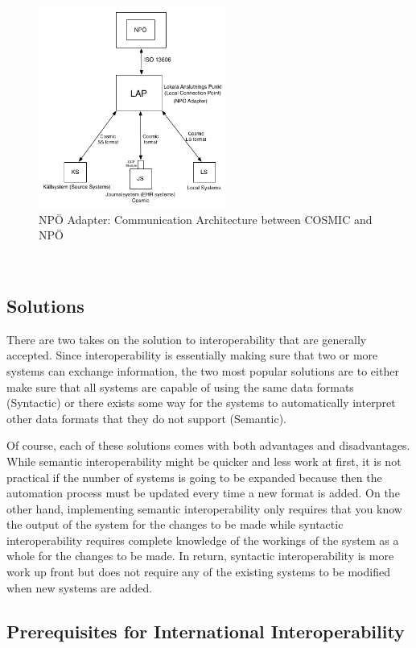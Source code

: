 \documentclass[14pt]{article}
\begin{document}
\begin{figure}[h!]
  \caption{NPÖ Adapter: Communication Architecture between COSMIC and NPÖ}
  \centering
    \includegraphics[width=0.55\textwidth]{Images/npoAdapt}
\end{figure}\

\subsection{Solutions}
\label{sec:interopSolutions}
There are two takes on the solution to interoperability that are generally accepted.  Since interoperability is essentially making sure that two or more systems can exchange information, the two most popular solutions are to either make sure that all systems are capable of using the same data formats (Syntactic) or there exists some way for the systems to automatically interpret other data formats that they do not support (Semantic).

Of course, each of these solutions comes with both advantages and disadvantages.  While semantic interoperability might be quicker and less work at first, it is not practical if the number of systems is going to be expanded because then the automation process must be updated every time a new format is added.  On the other hand, implementing semantic interoperability only requires that you know the output of the system for the changes to be made while syntactic interoperability requires complete knowledge of the workings of the system as a whole for the changes to be made.  In return, syntactic interoperability is more work up front but does not require any of the existing systems to be modified when new systems are added.

\subsection{Prerequisites for International Interoperability}
\end{document}
